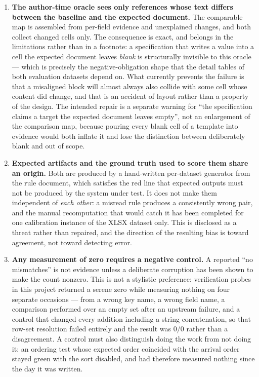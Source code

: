 \begin{enumerate}
  \item \textbf{The author-time oracle sees only references whose text differs between the baseline
    and the expected document.} The comparable map is assembled from per-field evidence and
    unexplained changes, and both collect changed cells only. The consequence is exact, and belongs
    in the limitations rather than in a footnote: a specification that writes a value into a cell the
    expected document leaves \emph{blank} is structurally invisible to this oracle --- which is
    precisely the negative-obligation shape that the detail tables of both evaluation datasets depend
    on. What currently prevents the failure is that a misaligned block will almost always also
    collide with some cell whose content did change, and that is an accident of layout rather than a
    property of the design. The intended repair is a separate warning for ``the specification claims
    a target the expected document leaves empty'', not an enlargement of the comparison map, because
    pouring every blank cell of a template into evidence would both inflate it and lose the
    distinction between deliberately blank and out of scope.
  \item \textbf{Expected artifacts and the ground truth used to score them share an origin.} Both are
    produced by a hand-written per-dataset generator from the rule document, which satisfies the red
    line that expected outputs must not be produced by the system under test. It does not make them
    independent of \emph{each other}: a misread rule produces a consistently wrong pair, and the
    manual recomputation that would catch it has been completed for one calibration instance of the
    XLSX dataset only. This is disclosed as a threat rather than repaired, and the direction of the
    resulting bias is toward agreement, not toward detecting error.
  \item \textbf{Any measurement of zero requires a negative control.} A reported ``no mismatches'' is
    not evidence unless a deliberate corruption has been shown to make the count nonzero. This is not
    a stylistic preference: verification probes in this project returned a serene zero while measuring
    nothing on four separate occasions --- from a wrong key name, a wrong field name, a comparison
    performed over an empty set after an upstream failure, and a control that changed every addition
    including a string concatenation, so that row-set resolution failed entirely and the result was
    $0/0$ rather than a disagreement. A control must also distinguish doing the work from not doing
    it: an ordering test whose expected order coincided with the arrival order stayed green with the
    sort disabled, and had therefore measured nothing since the day it was written.
\end{enumerate}

